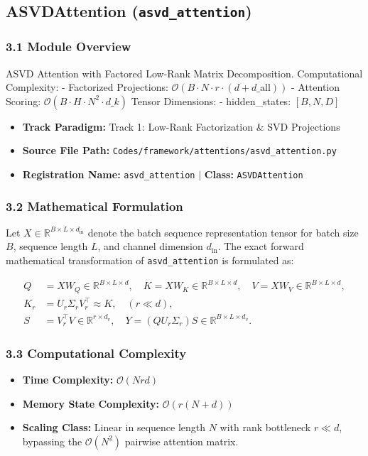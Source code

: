 \subsection{ASVDAttention (\texttt{asvd\_attention})}
\label{sec:app_module_asvd\_attention}

\subsubsection*{3.1 Module Overview}
ASVD Attention with Factored Low-Rank Matrix Decomposition.  Computational Complexity:     - Factorized Projections: $\mathcal{O}(B \cdot N \cdot r \cdot (d + d\_{\text{all}}))$     - Attention Scoring: $\mathcal{O}(B \cdot H \cdot N^2 \cdot d\_k)$  Tensor Dimensions:     - hidden\_states: $[B, N, D]$ 
\begin{itemize}
    \item \textbf{Track Paradigm:} Track 1: Low-Rank Factorization & SVD Projections
    \item \textbf{Source File Path:} \texttt{Codes/framework/attentions/asvd\_attention.py}
    \item \textbf{Registration Name:} \texttt{asvd\_attention} $\mid$ \textbf{Class:} \texttt{ASVDAttention}
\end{itemize}

\subsubsection*{3.2 Mathematical Formulation}
Let $X \in \mathbb{R}^{B \times L \times d_{\text{in}}}$ denote the batch sequence representation tensor for batch size $B$, sequence length $L$, and channel dimension $d_{\text{in}}$. The exact forward mathematical transformation of \texttt{asvd\_attention} is formulated as:

\begin{align}
Q &= X W_Q \in \mathbb{R}^{B \times L \times d}, \quad K = X W_K \in \mathbb{R}^{B \times L \times d}, \quad V = X W_V \in \mathbb{R}^{B \times L \times d}, \\
K_r &= U_r \Sigma_r V_r^\top \approx K, \quad (r \ll d), \\
S &= V_r^\top V \in \mathbb{R}^{r \times d_v}, \quad Y = (Q U_r \Sigma_r) S \in \mathbb{R}^{B \times L \times d_v}.
\end{align}


\subsubsection*{3.3 Computational Complexity}
\begin{itemize}
    \item \textbf{Time Complexity:} $\mathcal{O}(N r d)$
    \item \textbf{Memory State Complexity:} $\mathcal{O}(r(N + d))$
    \item \textbf{Scaling Class:} Linear in sequence length $N$ with rank bottleneck $r \ll d$, bypassing the $\mathcal{O}(N^2)$ pairwise attention matrix.
\end{itemize}


